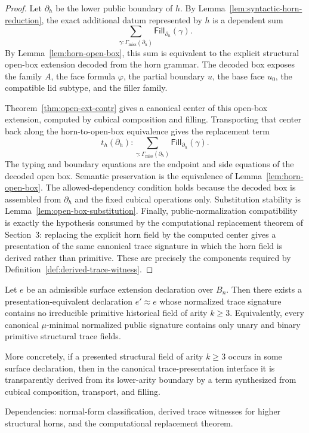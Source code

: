 \documentclass{lmcs}
\begin{document}
\begin{proof}
Let \(\partial_h\) be the lower public boundary of \(h\).  By
Lemma~\ref{lem:syntactic-horn-reduction}, the exact additional datum represented by \(h\) is
a dependent sum
\[
  \sum_{\gamma:\Gamma_{\mathrm{miss}}(\partial_h)}
    \mathsf{Fill}_{\partial_h}(\gamma).
\]
By Lemma~\ref{lem:horn-open-box}, this sum is equivalent to the explicit structural
open-box extension decoded from the horn grammar.  The decoded box exposes the family
\(A\), the face formula \(\varphi\), the partial boundary \(u\), the base face \(u_0\), the
compatible lid subtype, and the filler family.

Theorem~\ref{thm:open-ext-contr} gives a canonical center of this open-box extension,
computed by cubical composition and filling.  Transporting that center back along the
horn-to-open-box equivalence gives the replacement term
\[
  t_h(\partial_h)
  :
  \sum_{\gamma:\Gamma_{\mathrm{miss}}(\partial_h)}
    \mathsf{Fill}_{\partial_h}(\gamma).
\]
The typing and boundary equations are the endpoint and side equations of the decoded
open box.  Semantic preservation is the equivalence of
Lemma~\ref{lem:horn-open-box}.  The allowed-dependency condition holds because the decoded
box is assembled from \(\partial_h\) and the fixed cubical operations only.  Substitution
stability is Lemma~\ref{lem:open-box-substitution}.  Finally, public-normalization
compatibility is exactly the hypothesis consumed by the computational replacement theorem of
Section~3: replacing the explicit horn field by the computed center gives a presentation of
the same canonical trace signature in which the horn field is derived rather than primitive.
These are precisely the components required by
Definition~\ref{def:derived-trace-witness}.
\end{proof}

\begin{thm}
\label{thm:minimal-signature-elimination}
Let \(e\) be an admissible surface extension declaration over \(B_n\).  Then there exists a
presentation-equivalent declaration \(e'\approx e\) whose normalized trace signature contains
no irreducible primitive historical field of arity \(k\geq 3\).  Equivalently, every canonical
\(\mu\)-minimal normalized public signature contains only unary and binary primitive
structural trace fields.

More concretely, if a presented structural field of arity \(k\geq 3\) occurs in some surface
declaration, then in the canonical trace-presentation interface it is transparently derived
from its lower-arity boundary by a term synthesized from cubical composition, transport, and
filling.

Dependencies: normal-form classification, derived trace witnesses for higher structural
horns, and the computational replacement theorem.
\end{thm}
\end{document}
